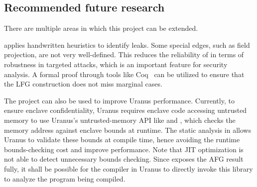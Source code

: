 \subsection{Recommended future research}\label{subsec:recommended-future-research}
There are multiple areas in which this project can be extended.

\pname{} applies handwritten heuristics to identify leaks.
Some special edges, such as field projection, are not very well-defined.
This reduces the reliability of \pname{} in terms of robustness in targeted attacks,
which is an important feature for security analysis.
A formal proof through tools like Coq~\cite{coq}
can be utilized to ensure that the \ac{LFG} construction does not miss marginal cases.

The project can also be used to improve Uranus performance.
Currently, to ensure enclave confidentiality,
Uranus requires enclave code accessing untrusted memory to
use Uranus's untrusted-memory \ac{API}
like  and \cite{uranus},
which checks the memory address against enclave bounds at runtime.
The static analysis in \pname{} allows Uranus to validate these bounds at compile time,
hence avoiding the runtime bounds-checking cost and improve performance.
Note that JIT optimization is not able to detect unnecessary bounds checking.
Since  exposes the \ac{AFG} result fully,
it shall be possible for the compiler in Uranus
to directly invoke this library to analyze the program being compiled.

